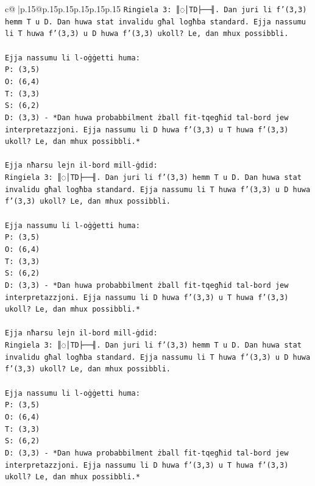 \documentclass{article}
\begin{document}
{\begin{supertabular}{c@{$\;$}|p{.15\linewidth}@{}p{.15\linewidth}p{.15\linewidth}p{.15\linewidth}p{.15\linewidth}p{.15\linewidth}}
{{{\texttt{Ringiela 3: ║◌│TD├──╢. Dan juri li f'(3,3) hemm T u D. Dan huwa stat invalidu għal logħba standard. Ejja nassumu li T huwa f'(3,3) u D huwa f'(3,3) ukoll? Le, dan mhux possibbli.} \\
\\ 
\texttt{Ejja nassumu li l{-}oġġetti huma:} \\
\texttt{P: (3,5)} \\
\texttt{O: (6,4)} \\
\texttt{T: (3,3)} \\
\texttt{S: (6,2)} \\
\texttt{D: (3,3) {-} *Dan huwa probabbilment żball fit{-}tqegħid tal{-}bord jew interpretazzjoni. Ejja nassumu li D huwa f'(3,3) u T huwa f'(3,3) ukoll? Le, dan mhux possibbli.*} \\
\\ 
\texttt{Ejja nħarsu lejn il{-}bord mill{-}ġdid:} \\
\texttt{Ringiela 3: ║◌│TD├──╢. Dan juri li f'(3,3) hemm T u D. Dan huwa stat invalidu għal logħba standard. Ejja nassumu li T huwa f'(3,3) u D huwa f'(3,3) ukoll? Le, dan mhux possibbli.} \\
\\ 
\texttt{Ejja nassumu li l{-}oġġetti huma:} \\
\texttt{P: (3,5)} \\
\texttt{O: (6,4)} \\
\texttt{T: (3,3)} \\
\texttt{S: (6,2)} \\
\texttt{D: (3,3) {-} *Dan huwa probabbilment żball fit{-}tqegħid tal{-}bord jew interpretazzjoni. Ejja nassumu li D huwa f'(3,3) u T huwa f'(3,3) ukoll? Le, dan mhux possibbli.*} \\
\\ 
\texttt{Ejja nħarsu lejn il{-}bord mill{-}ġdid:} \\
\texttt{Ringiela 3: ║◌│TD├──╢. Dan juri li f'(3,3) hemm T u D. Dan huwa stat invalidu għal logħba standard. Ejja nassumu li T huwa f'(3,3) u D huwa f'(3,3) ukoll? Le, dan mhux possibbli.} \\
\\ 
\texttt{Ejja nassumu li l{-}oġġetti huma:} \\
\texttt{P: (3,5)} \\
\texttt{O: (6,4)} \\
\texttt{T: (3,3)} \\
\texttt{S: (6,2)} \\
\texttt{D: (3,3) {-} *Dan huwa probabbilment żball fit{-}tqegħid tal{-}bord jew interpretazzjoni. Ejja nassumu li D huwa f'(3,3) u T huwa f'(3,3) ukoll? Le, dan mhux possibbli.*} \\
}}}
\end{supertabular}}
\end{document}
